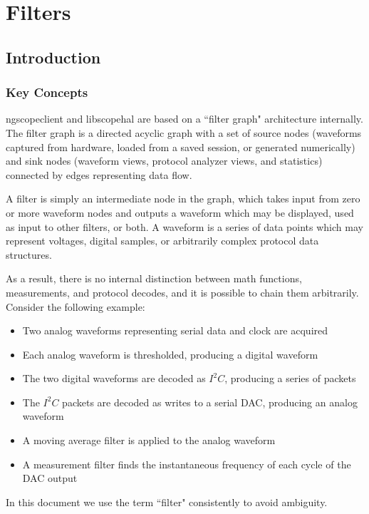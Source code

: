 \chapter{Filters}

\section{Introduction}

\subsection{Key Concepts}

ngscopeclient and libscopehal are based on a ``filter graph" architecture internally. The filter graph is a directed
acyclic graph with a set of source nodes (waveforms captured from hardware, loaded from a saved session, or generated
numerically) and sink nodes (waveform views, protocol analyzer views, and statistics) connected by edges representing
data flow.

A filter is simply an intermediate node in the graph, which takes input from zero or more waveform nodes and outputs a
waveform which may be displayed, used as input to other filters, or both. A waveform is a series of data points which
may represent voltages, digital samples, or arbitrarily complex protocol data structures.

As a result, there is no internal distinction between math functions, measurements, and protocol decodes, and it is
possible to chain them arbitrarily. Consider the following example:

\begin{itemize}
\item Two analog waveforms representing serial data and clock are acquired
\item Each analog waveform is thresholded, producing a digital waveform
\item The two digital waveforms are decoded as $I^2C$, producing a series of packets
\item The $I^2C$ packets are decoded as writes to a serial DAC, producing an analog waveform
\item A moving average filter is applied to the analog waveform
\item A measurement filter finds the instantaneous frequency of each cycle of the DAC output
\end{itemize}

In this document we use the term ``filter" consistently to avoid ambiguity.

